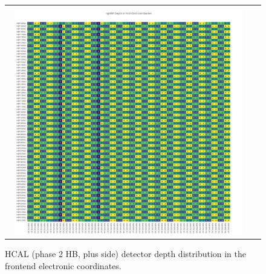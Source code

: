 \clearpage
\begin{figure}[htb]
 \begin{center}
  \begin{tabular}{cc}
   \includegraphics[angle=0,width=0.95\textwidth]{figures/appendix/ngHBP_Depth_in_FrontEnd.png}
  \end{tabular}
	\caption{HCAL (phase 2 HB, plus side) detector depth distribution in the frontend electronic coordinates.}
  \label{fig:lmapngHBPDepthFEC}
 \end{center}
\end{figure}

